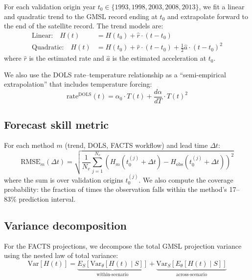 \documentclass[11pt]{article}
\begin{document}
For each validation origin year $t_0 \in \{1993, 1998, 2003, 2008, 2013\}$, we fit a linear and quadratic trend to the GMSL record ending at $t_0$ and extrapolate forward to the end of the satellite record.  The trend models are:
\begin{align}
  \text{Linear:} \quad H(t) &= H(t_0) + \hat{r} \cdot (t - t_0) \label{eq:linear} \\
  \text{Quadratic:} \quad H(t) &= H(t_0) + \hat{r} \cdot (t - t_0) + \tfrac{1}{2}\hat{a} \cdot (t - t_0)^2 \label{eq:quad}
\end{align}
where $\hat{r}$ is the estimated rate and $\hat{a}$ is the estimated acceleration at $t_0$.

We also use the DOLS rate--temperature relationship as a ``semi-empirical extrapolation'' that includes temperature forcing:
\begin{equation}
  \text{rate}^{\text{DOLS}}(t) = \alpha_0 \cdot T(t) + \frac{d\alpha}{dT} \cdot T(t)^2
  \label{eq:dols}
\end{equation}

\subsection{Forecast skill metric}

For each method $m$ (trend, DOLS, FACTS workflow) and lead time $\Delta t$:
\begin{equation}
  \text{RMSE}_m(\Delta t) = \sqrt{\frac{1}{N_v} \sum_{j=1}^{N_v} \left(H_m(t_0^{(j)} + \Delta t) - H_{\text{obs}}(t_0^{(j)} + \Delta t)\right)^2}
  \label{eq:rmse}
\end{equation}
where the sum is over validation origins $t_0^{(j)}$.  We also compute the coverage probability: the fraction of times the observation falls within the method's 17--83\% prediction interval.

\subsection{Variance decomposition}

For the FACTS projections, we decompose the total GMSL projection variance using the nested law of total variance:
\begin{equation}
  \text{Var}[H(t)] = \underbrace{E_S[\text{Var}_{\theta}[H(t) \mid S]]}_{\text{within-scenario}} + \underbrace{\text{Var}_S[E_{\theta}[H(t) \mid S]]}_{\text{across-scenario}}
  \label{eq:ltv}
\end{equation}
\end{document}
